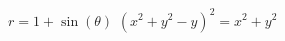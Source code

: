 { $r = 1 + \sin(\theta)$ \label{equpolartorectlast}}
{ $\left( x^{2} + y^{2} - y\right)^{2} = x^{2} + y^{2}$}
